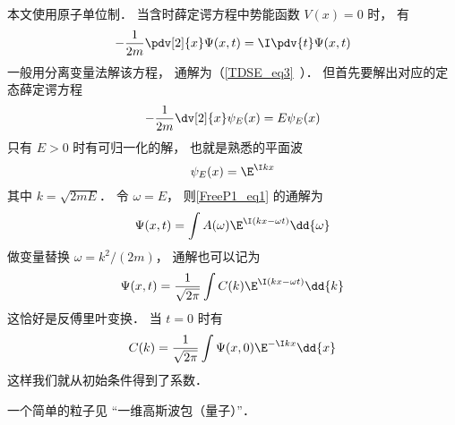
\begin{issues}
\issueDraft
\end{issues}


本文使用原子单位制． 当含时薛定谔方程中势能函数 $V(x) = 0$ 时， 有
\begin{equation}\label{FreeP1_eq1}
-\frac{1}{2m}\pdv[2]{x}\Psi(x,t) = \I \pdv{t} \Psi(x,t)
\end{equation}
一般用分离变量法解该方程， 通解为（\autoref{TDSE_eq3}~）． 但首先要解出对应的定态薛定谔方程
\begin{equation}
-\frac{1}{2m}\dv[2]{x}\psi_E(x) = E \psi_E(x)
\end{equation}
只有 $E > 0$ 时有可归一化的解， 也就是熟悉的平面波
\begin{equation}
\psi_E(x) = \E^{\I k x}
\end{equation}
其中 $k = \sqrt{2mE}$． 令 $\omega = E$， 则\autoref{FreeP1_eq1} 的通解为
\begin{equation}
\Psi(x,t) = \int A(\omega) \E^{\I (k x - \omega t)} \dd{\omega}
\end{equation}
做变量替换 $\omega = k^2/(2m)$， 通解也可以记为
\begin{equation}
\Psi(x,t) = \frac{1}{\sqrt{2\pi}} \int C(k) \E^{\I (k x - \omega t)} \dd{k}
\end{equation}
这恰好是反傅里叶变换． 当 $t = 0$ 时有
\begin{equation}
C(k) = \frac{1}{\sqrt{2\pi}} \int \Psi(x,0) \E^{-\I k x} \dd{x}
\end{equation}
这样我们就从初始条件得到了系数．

一个简单的粒子见 “一维高斯波包（量子）”．
